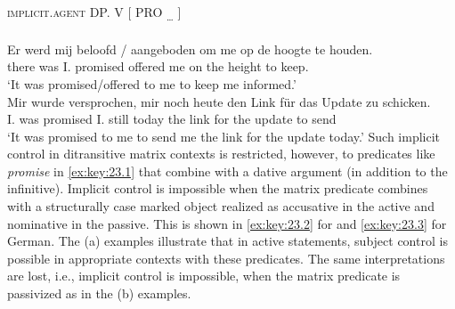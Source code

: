 \documentclass[output=paper]{langsci/langscibook}
\begin{document}
\ea\label{ex:key:23.1}
    \textsc{implicit.agent}  DP.\Dat{}  V  [\textsubscript{\Inf{}}  PRO\textsubscript{ …}  ]\\
    \ea\label{ex:key:23.1a}  \parencite[171, (8)]{vanUrk2013}\\
        \sn
		\gll Er  werd  mij  beloofd / aangeboden  om  me  op de hoogte  te houden.\\
                there  was  I.\Dat{}  promised {} offered  \Comp{}  me  on the height  to keep.\textsc{\Inf{}}\\
		\glt ‘It was promised/offered to me to keep me informed.’
    \ex\label{ex:key:23.1b}  \parencite[171, (9a)]{vanUrk2013}\\
        \sn
		\gll Mir  wurde  versprochen,  mir  noch heute  den Link für das Update  zu schicken.\\
			I.\Dat{}  was  promised  I.\Dat{}  still today  the link for the update  to send\\
		\glt ‘It was promised to me to send me the link for the update today.’
	\z
\z
%
Such implicit control in ditransitive matrix contexts is restricted, however,
to predicates like \emph{promise} in \eqref{ex:key:23.1} that combine with a dative argument
(in addition to the infinitive). Implicit control is impossible when the matrix
predicate combines with a structurally case marked object realized as
accusative in the active and nominative in the passive.
This is shown in \eqref{ex:key:23.2} for  and \eqref{ex:key:23.3} for German. The (a) examples
illustrate that in active statements, subject control is possible in
appropriate contexts with these predicates. The same interpretations are lost,
i.e., implicit control is impossible, when the matrix predicate is passivized
as in the (b) examples.
\end{document}
